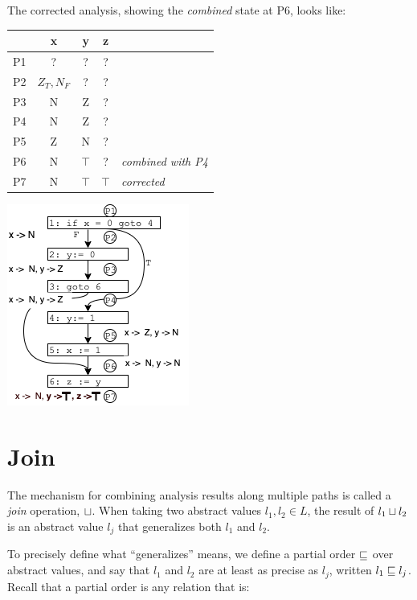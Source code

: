 \documentclass[11pt]{article}
\begin{document}
The corrected analysis, showing the \emph{combined} state at P6, looks like: 

\tablespace
\begin{center}
\begin{minipage}[t][-9.7em][b]{0.5\textwidth} %
\begin{tabular}{r | c c c l}
  & x & y & z \\
\hline
P1 & ? & ? & ? \\
P2 & $Z_T,N_F$ & ?  & ? \\
P3 & N & Z & ? \\
P4 & N & Z & ? \\
P5 & Z & N & ?  \\
P6 & N & $\top$ & ? & \textit{combined with P4} \\
P7 & N & $\top$ & $\top$ & \textit{corrected}\\
\end{tabular}
\end{minipage}
\hspace*{1em}
\includegraphics[scale=0.8]{images/altpathright}
\end{center}
\tablespace

\section{Join}

The mechanism for combining analysis results along multiple paths
is called a \emph{join} operation, $\sqcup$.  When taking two abstract values $l_1, l_2
\in L$, the result of $l_1 \sqcup l_2$ is an abstract value $l_j$ that
generalizes both $l_1$ and $l_2$.

To precisely define what ``generalizes'' means, we define a partial order $\sqsubseteq$
over abstract values, and say that $l_1$ and $l_2$ are at least as precise as
$l_j$, written $l_1 \sqsubseteq l_j$.  Recall that a partial order is any relation
that is:
\end{document}
